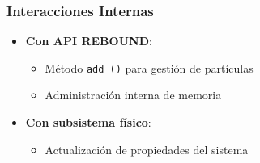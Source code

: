 \subsubsection{Interacciones Internas}
\begin{itemize}
    \item \textbf{Con API REBOUND}:
    \begin{itemize}
        \item Método \texttt{add~()} para gestión de partículas
        \item Administración interna de memoria
    \end{itemize}
    \item \textbf{Con subsistema físico}:
    \begin{itemize}
        \item Actualización de propiedades del sistema
    \end{itemize}
\end{itemize}

